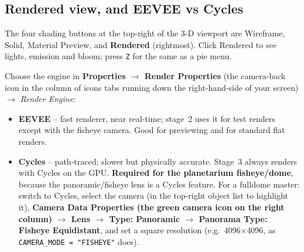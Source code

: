 \documentclass[11pt]{article}
\newcommand{\pc}[1]{\texttt{#1}}
\begin{document}
\subsection{Rendered view, and EEVEE vs Cycles}
The four shading buttons at the top-right of the 3-D viewport are Wireframe,
Solid, Material Preview, and \textbf{Rendered} (rightmost). Click Rendered to
see lights, emission and bloom; press \pc{Z} for the same as a pie menu.
 
Choose the engine in \textbf{Properties $\rightarrow$ Render Properties} (the
camera-back icon in the column of icons tabs running down the right-hand-side of your screen) $\rightarrow$ \emph{Render Engine}:
\begin{itemize}
  \item \textbf{EEVEE} -- fast renderer, near real-time; stage~2 uses it for test renders except with the fisheye camera. Good for previewing and for standard flat renders.
 
  \item \textbf{Cycles} -- path-traced; slower but physically accurate. Stage~3 always renders with Cycles on the GPU.
        \textbf{Required for the planetarium fisheye/dome}, because the
        panoramic/fisheye lens is a Cycles feature. For a fulldome master:
        switch to Cycles, select the camera (in the top-right object list to highlight it), \textbf{Camera Data Properties (the green camera icon on the right column)
        $\rightarrow$ Lens $\rightarrow$ Type: Panoramic $\rightarrow$ Panorama
        Type: Fisheye Equidistant}, and set a square resolution (e.g.\
        4096$\times$4096, as \pc{CAMERA\_MODE = "FISHEYE"} does).
\end{itemize}
 
\end{document}
